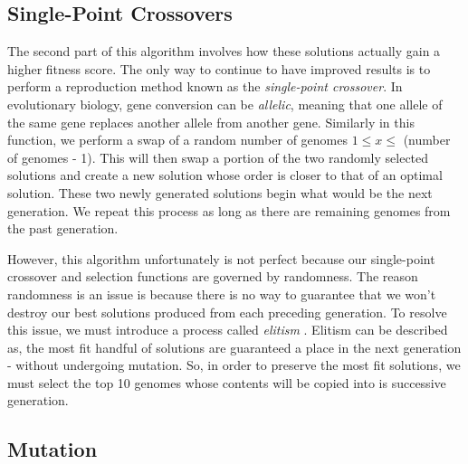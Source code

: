 \subsection{Single-Point Crossovers}

The second part of this algorithm involves how these solutions actually gain a higher fitness score. 
The only way to continue to have improved results is to perform a reproduction method known as the \emph{single-point crossover}. 
In evolutionary biology, gene conversion can be \emph{allelic}, meaning that one allele of the same gene replaces another allele from another gene. 
Similarly in this function, we perform a swap of a random number of genomes $1 \leq x \leq$ (number of genomes - 1). 
This will then swap a portion of the two randomly selected solutions and create a new solution whose order is closer to that of an optimal solution. 
These two newly generated solutions begin what would be the next generation. 
We repeat this process as long as there are remaining genomes from the past generation. 

However, this algorithm unfortunately is not perfect because our single-point crossover and selection functions are governed by randomness. 
The reason randomness is an issue is because there is no way to guarantee that we won't destroy our best solutions produced from each preceding generation. To resolve this issue, we must introduce a process called \emph{elitism} \cite{Ahn}. 
Elitism can be described as, the most fit handful of solutions are guaranteed a place in the next generation - without undergoing mutation. 
So, in order to preserve the most fit solutions, we must select the top 10 genomes whose contents will be copied into is successive generation. 

\subsection{Mutation}

